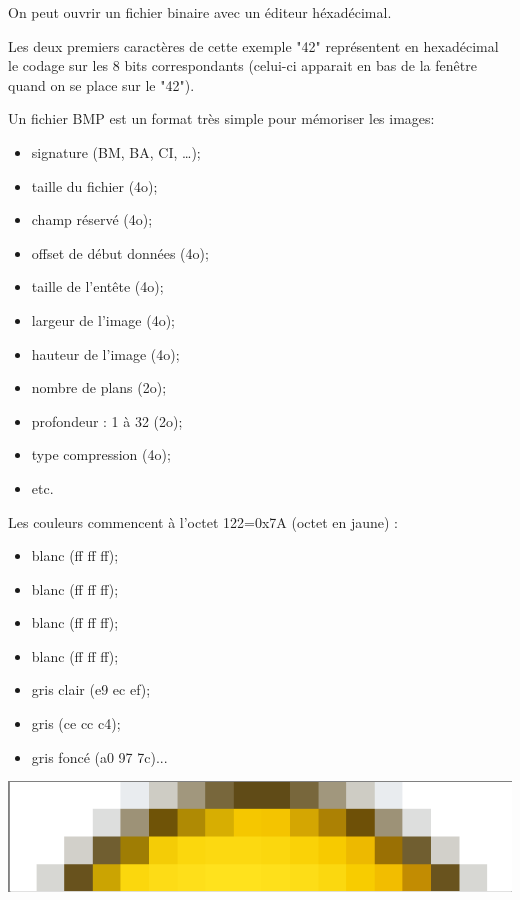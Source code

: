 \documentclass[10pt,fleqn]{article} %
\begin{document}
\begin{minipage}[c]{.53\linewidth}

On peut ouvrir un fichier binaire avec un éditeur héxadécimal.

Les deux premiers caractères de cette exemple "42" représentent en hexadécimal le codage sur les 8 bits correspondants (celui-ci apparait en bas de la fenêtre quand on se place sur le "42").

Un fichier BMP est un format très simple pour mémoriser les images:
\begin{itemize}
\item signature (BM, BA, CI, …);
\item taille du fichier (4o);
\item champ réservé (4o);
\item offset de début données (4o);
\item taille de l'entête (4o);
\item largeur de l'image (4o);
\item hauteur de l'image (4o);
\item nombre de plans (2o);
\item profondeur : 1 à 32 (2o);
\item type compression (4o);
\item etc.
\end{itemize}


Les couleurs commencent à l'octet 122=0x7A (octet en jaune) :
\begin{itemize}
\item blanc (ff ff ff);
\item blanc (ff ff ff);
\item blanc (ff ff ff);
\item blanc (ff ff ff);
\item gris clair (e9 ec ef);
\item gris (ce cc c4);
\item gris foncé (a0 97 7c)...
\end{itemize}
\begin{center}
\includegraphics[width=.5\textwidth]{images/image8.png}
\end{center}
\end{minipage} \hfill
\end{document}
